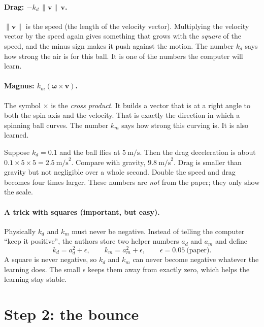 \documentclass[11pt,a4paper]{article}
\newcommand{\vv}{\mathbf{v}}
\newcommand{\ww}{\boldsymbol{\omega}}
\begin{document}
\paragraph{Drag: $-k_d\,\|\vv\|\,\vv$.}
$\|\vv\|$ is the speed (the length of the velocity vector). Multiplying the velocity vector by the
speed again gives something that grows with the \emph{square} of the speed, and the minus sign
makes it push against the motion. The number $k_d$ says how strong the air is for this ball.
It is one of the numbers the computer will learn.

\paragraph{Magnus: $k_m(\ww\times\vv)$.}
The symbol $\times$ is the \emph{cross product}. It builds a vector that is at a right angle to
both the spin axis and the velocity. That is exactly the direction in which a spinning ball
curves. The number $k_m$ says how strong this curving is. It is also learned.

\begin{toy}
Suppose $k_d=0.1$ and the ball flies at $5\ \text{m/s}$. Then the drag deceleration is about
$0.1\times 5\times 5 = 2.5\ \text{m/s}^2$. Compare with gravity, $9.8\ \text{m/s}^2$. Drag is
smaller than gravity but not negligible over a whole second. Double the speed and drag becomes
four times larger. These numbers are \emph{not} from the paper; they only show the scale.
\end{toy}

\paragraph{A trick with squares (important, but easy).}
Physically $k_d$ and $k_m$ must never be negative. Instead of telling the computer
``keep it positive'', the authors store two helper numbers $a_d$ and $a_m$ and define
\begin{equation*}
k_d = a_d^2+\epsilon,\qquad k_m = a_m^2+\epsilon,\qquad \epsilon=0.05\ \text{(paper)}.
\end{equation*}
\noindent A square is never negative, so $k_d$ and $k_m$ can never become negative whatever the
learning does. The small $\epsilon$ keeps them away from exactly zero, which helps the
learning stay stable.

\section{Step 2: the bounce}
\end{document}
